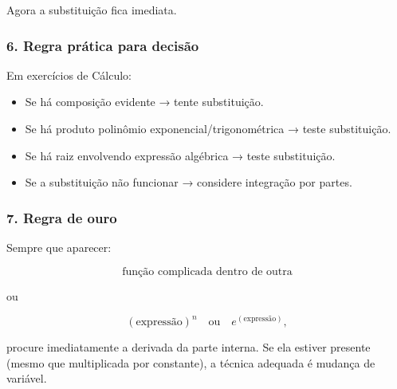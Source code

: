 Agora a substituição fica imediata.

\subsubsection*{6. Regra prática para decisão}

Em exercícios de Cálculo:

\begin{itemize}
    \item Se há composição evidente → tente substituição.
    \item Se há produto polinômio \times exponencial/trigonométrica → teste substituição.
    \item Se há raiz envolvendo expressão algébrica → teste substituição.
    \item Se a substituição não funcionar → considere integração por partes.
\end{itemize}

\subsubsection*{7. Regra de ouro}

Sempre que aparecer:

\[
\text{função complicada dentro de outra}
\]

ou

\[
(\text{expressão})^{n}
\quad \text{ou} \quad
e^{(\text{expressão})},
\]

procure imediatamente a derivada da parte interna.  
Se ela estiver presente (mesmo que multiplicada por constante), a técnica adequada é mudança de variável.


